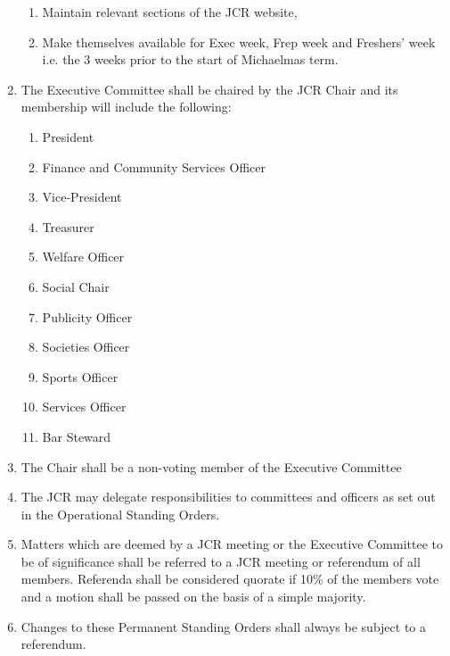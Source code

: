 \begin{enumerate}
\begin{enumerate}
            \item Maintain relevant sections of the JCR website,
            \item Make themselves available for Exec week, Frep week and Freshers’ week i.e. the 3 weeks prior to the start of Michaelmas term.
        \end{enumerate}
        \item The Executive Committee shall be chaired by the JCR Chair and its membership will include the following:
        \begin{enumerate}
            \item President
            \item Finance and Community Services Officer
            \item Vice-President
            \item Treasurer
            \item Welfare Officer
            \item Social Chair
            \item Publicity Officer
            \item Societies Officer
            \item Sports Officer
            \item Services Officer
            \item Bar Steward
        \end{enumerate}
        \item The Chair shall be a non-voting member of the Executive Committee
        \item The JCR may delegate responsibilities to committees and officers as set out in the Operational
Standing Orders.
        \item Matters which are deemed by a JCR meeting or the Executive Committee to be of significance shall be referred to a JCR meeting or referendum of all members. Referenda shall be considered quorate if 10\% of the members vote and a motion shall be passed on the basis of a simple majority.
        \item Changes to these Permanent Standing Orders shall always be subject to a referendum.
\end{enumerate}

